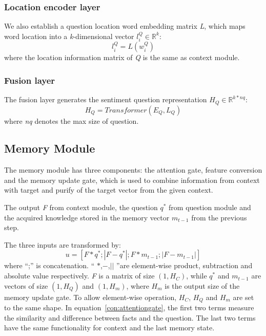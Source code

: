 \documentclass{ieeeaccess}
\begin{document}
\subsubsection{Location encoder layer}
We also establish a question location word embedding matrix \emph{L}, which maps word location into a \emph{k}-dimensional vector $l_i^Q \in \mathbb{R}^k$:
\begin{equation}l_i^Q = L\left(w_i^Q\right)\end{equation}
where the location information matrix of \emph{Q} is the same as context module.

\subsubsection{Fusion layer}
The fusion layer generates the sentiment question representation $H_Q \in \mathbb{R}^{k\ast nq}$:
\begin{equation}H_Q = Transformer\left(E_Q, L_Q\right)\label{H_Q}\end{equation}
where \emph{nq} denotes the max size of question.

\subsection{Memory Module}
The memory module has three components: the attention gate, feature conversion and the memory update gate, which is used to combine information from context with target and purify of the target vector from the given context.

The output \emph{F} from context module, the question $q^\ast$ from question module and the acquired knowledge stored in the memory vector $m_{t-1}$ from the previous step.

The three inputs are transformed by:
\begin{equation}u = \left[F \ast q^\ast; \left|F - q^\ast\right|; F \ast m_{t-1}; \left|F - m_{t-1} \right|\right]\label{con:attentiongate}\end{equation}
where “;” is concatenation. “ $\ast$,$-$,$\left|\right|$ ”are element-wise product, subtraction and absolute value respectively. \emph{F} is a matrix of size $\left(1, H_C\right)$, while $q^\ast$ and $m_{t-1}$ are vectors of size $\left(1, H_Q\right)$ and $\left(1, H_m\right)$, where $H_m$ is the output size of the memory update gate. To allow element-wise operation, $H_C$, $H_Q$ and $H_m$ are set to the same shape. In equation~\eqref{con:attentiongate}, the first two terms measure the similarity and difference between facts and the question. The last two terms have the same functionality for context and the last memory state.
\end{document}
